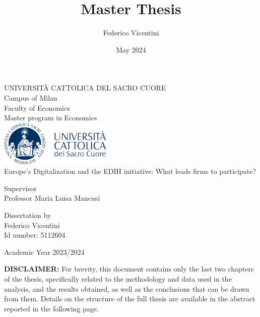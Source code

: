 \documentclass[12pt]{report}
\title{Master Thesis}
\author{Federico Vicentini}
\date{May 2024}
\begin{document}
\begin{titlepage}
    \centering

    \Large UNIVERSITÀ CATTOLICA DEL SACRO CUORE\\
    \Large Campus of Milan\\
    \Large Faculty of Economics\\
    \Large Master program in Economics\\
    \vspace{2cm}
    \includegraphics[width=0.4\textwidth]{Figures/00-logo.png}\\ 
    \vspace{2cm}
    \Huge Europe's Digitalization and the EDIH initiative: What leads firms to participate? \\

    \vspace{2cm}

    \begin{flushleft}
    \large Supervisor \\
    \large Professor Maria Luisa Mancusi
    \end{flushleft}
    
    \vfill
    
    \hfill
    \begin{minipage}{0.3\textwidth}
        \raggedright
        \large Dissertation by\\
        \large Federico Vicentini\\
        \large Id number: 5112604
    \end{minipage}
    
    \vspace{0.8cm}

    \Large{Academic Year 2023/2024}
    
\end{titlepage}

\newpage

\begin{center}
    \vspace*{\fill}
    \textbf{DISCLAIMER:} For brevity, this document contains only the last two chapters of the thesis, specifically related to the methodology and data used in the analysis, and the results obtained, as well as the conclusions that can be drawn from them. Details on the structure of the full thesis are available in the abstract reported in the following page.
    \vspace*{\fill}
\end{center}
\end{document}
